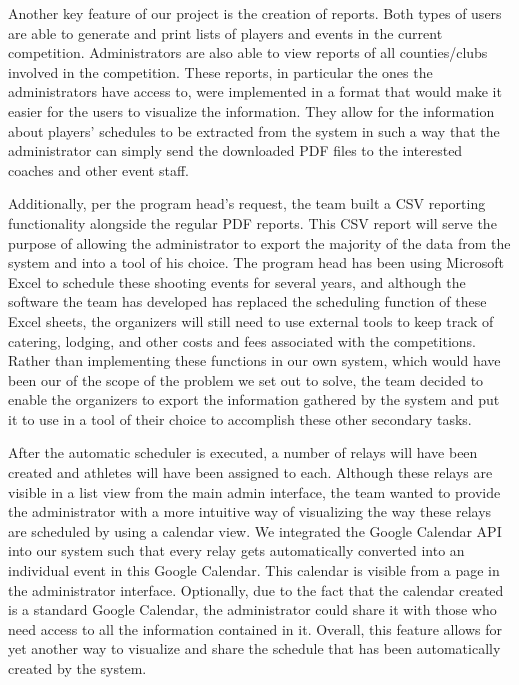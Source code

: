 \documentclass[sigconf]{acmart}
\begin{document}
Another key feature of our project is the creation of reports. Both types of users are able to generate and print lists of players and events in the current competition. Administrators are also able to view reports of all counties/clubs involved in the competition. These reports, in particular the ones the administrators have access to, were implemented in a format that would make it easier for the users to visualize the information. They allow for the information about players' schedules to be extracted from the system in such a way that the administrator can simply send the downloaded PDF files to the interested coaches and other event staff.

Additionally, per the program head's request, the team built a CSV reporting functionality alongside the regular PDF reports. This CSV report will serve the purpose of allowing the administrator to export the majority of the data from the system and into a tool of his choice. The program head has been using Microsoft Excel to schedule these shooting events for several years, and although the software the team has developed has replaced the scheduling function of these Excel sheets, the organizers will still need to use external tools to keep track of catering, lodging, and other costs and fees associated with the competitions. Rather than implementing these functions in our own system, which would have been our of the scope of the problem we set out to solve, the team decided to enable the organizers to export the information gathered by the system and put it to use in a tool of their choice to accomplish these other secondary tasks.

After the automatic scheduler is executed, a number of relays will have been created and athletes will have been assigned to each. Although these relays are visible in a list view from the main admin interface, the team wanted to provide the administrator with a more intuitive way of visualizing the way these relays are scheduled by using a calendar view. We integrated the Google Calendar API into our system such that every relay gets automatically converted into an individual event in this Google Calendar. This calendar is visible from a page in the administrator interface. Optionally, due to the fact that the calendar created is a standard Google Calendar, the administrator could share it with those who need access to all the information contained in it. Overall, this feature allows for yet another way to visualize and share the schedule that has been automatically created by the system. 
\end{document}

